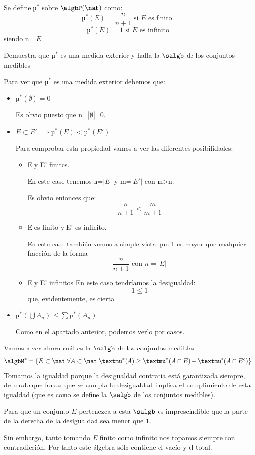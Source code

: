 \begin{problem}[16]
Se define $µ^*$ sobre $\algbP (\nat)$ como:
\[µ^*(E) = \frac{n}{n+1} \text{ si } E \text{ es finito }\]
\[µ^*(E) = 1 \text{ si } E \text{ es infinito}\]
siendo n=$|E|$

Demuestra que $µ^*$ es una medida exterior y halla la $\salgb$ de los conjuntos medibles
\solution

Para ver que $µ^*$ es una medida exterior debemos que:
\begin{itemize}
\item $µ^*(\emptyset)= 0$

Es obvio puesto que n=$|\emptyset|$=0.

\item $E \subset E' \implies µ^*(E)<µ^*(E')$

Para comprobar esta propiedad vamos a ver las diferentes posibilidades:
\begin{itemize}
\item E y E' finitos.

En este caso tenemos n=$|E|$ y m=$|E'|$ con m>n.

Es obvio entonces que:
\[\frac{n}{n+1} < \frac{m}{m+1}\]

\item E es finito y E' es infinito.

En este caso también vemos a simple vista que 1 es mayor que cualquier fracción de la forma
\[\frac{n}{n+1} \text{ con } n = |E|\]

\item E y E' infinitos
En este caso tendríamos la desigualdad:
\[1 \leq 1\]
que, evidentemente, es cierta
\end{itemize}

\item $µ^*(\bigcup A_n) \leq \sum µ^*(A_n)$

Como en el apartado anterior, podemos verlo por casos.
\end{itemize}

Vamos a ver ahora cuál es la $\salgb$ de los conjuntos medibles.
\[\algbM^*=\{E \subset \nat \ \forall A \subset \nat \ µ^*(A)\geq µ^*(A \cap E) + µ^*(A \cap E^c)\}\]
Tomamos la igualdad porque la desigualdad contraria está garantizada siempre, de modo que forzar que se cumpla la desigualdad implica el cumplimiento de esta igualdad (que es como se define la $\salgb$ de los conjuntos medibles).

Para que un conjunto $E$ pertenezca a esta $\salgb$ es imprescindible que la parte de la derecha de la desigualdad sea menor que 1.

Sin embargo, tanto tomando $E$ finito como infinito nos topamos siempre con contradicción. Por tanto este álgebra sólo contiene el vacío y el total.
\end{problem}


